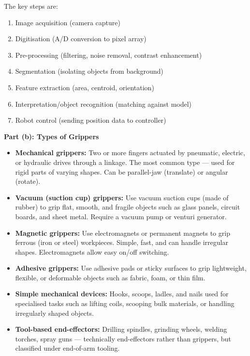 \documentclass[12pt,a3paper]{article}
\begin{document}
\begin{enumerate}
\begin{tcolorbox}[enhanced,breakable,ansbox,colback=cA!4,colframe=cA,
  boxrule=0.8pt,arc=5pt,
  title={\textbf{Answer}},fonttitle=\bfseries\color{white},colbacktitle=cA]
The key steps are:
\begin{enumerate}[leftmargin=1.5em,itemsep=1pt,label=\arabic*.]
  \item Image acquisition (camera capture)
  \item Digitisation (A/D conversion to pixel array)
  \item Pre-processing (filtering, noise removal, contrast enhancement)
  \item Segmentation (isolating objects from background)
  \item Feature extraction (area, centroid, orientation)
  \item Interpretation/object recognition (matching against model)
  \item Robot control (sending position data to controller)
\end{enumerate}

\hrulefill

\textbf{Part (b): Types of Grippers}

\begin{itemize}[leftmargin=1.5em,itemsep=3pt]
  \item \textbf{Mechanical grippers:} Two or more fingers actuated by
        pneumatic, electric, or hydraulic drives through a linkage. The
        most common type — used for rigid parts of varying shapes. Can
        be parallel-jaw (translate) or angular (rotate).
  \item \textbf{Vacuum (suction cup) grippers:} Use vacuum suction cups
        (made of rubber) to grip flat, smooth, and fragile objects such as
        glass panels, circuit boards, and sheet metal. Require a vacuum
        pump or venturi generator.
  \item \textbf{Magnetic grippers:} Use electromagnets or permanent
        magnets to grip ferrous (iron or steel) workpieces. Simple, fast,
        and can handle irregular shapes. Electromagnets allow easy
        on/off switching.
  \item \textbf{Adhesive grippers:} Use adhesive pads or sticky surfaces
        to grip lightweight, flexible, or deformable objects such as fabric,
        foam, or thin film.
  \item \textbf{Simple mechanical devices:} Hooks, scoops, ladles, and
        nails used for specialised tasks such as lifting coils, scooping
        bulk materials, or handling irregularly shaped objects.
  \item \textbf{Tool-based end-effectors:} Drilling spindles, grinding
        wheels, welding torches, spray guns — technically end-effectors
        rather than grippers, but classified under end-of-arm tooling.
\end{itemize}


\end{tcolorbox}
\end{enumerate}
\end{document}
